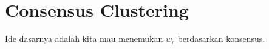 \documentclass[a4paper,12pt]{tufte-handout}
\begin{document}















\section{Consensus Clustering}\label{sec:consensus}
Ide dasarnya adalah kita mau menemukan $w_{c}$ berdasarkan konsensus.
\end{document}
